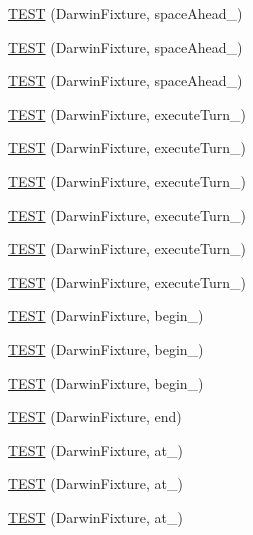 \begin{DoxyCompactItemize}
\hyperlink{TestDarwin_8c_09_09_a8eda44459d1b10b052d6e224f96d76f4}{T\-E\-S\-T} (Darwin\-Fixture, space\-Ahead\-\_)
\item 
\hyperlink{TestDarwin_8c_09_09_a5d85fe4e35632b4372030b5219815c71}{T\-E\-S\-T} (Darwin\-Fixture, space\-Ahead\-\_)
\item 
\hyperlink{TestDarwin_8c_09_09_a5425ef55ba9a7d3302777d2ee1416f3f}{T\-E\-S\-T} (Darwin\-Fixture, space\-Ahead\-\_)
\item 
\hyperlink{TestDarwin_8c_09_09_a0d2e0719c7c0bfcb95b02942c02ae39d}{T\-E\-S\-T} (Darwin\-Fixture, execute\-Turn\-\_)
\item 
\hyperlink{TestDarwin_8c_09_09_aad19062b2f5d9f6ece48370226615537}{T\-E\-S\-T} (Darwin\-Fixture, execute\-Turn\-\_)
\item 
\hyperlink{TestDarwin_8c_09_09_aec870de65cdf3fb7c80d42a12aa55fe9}{T\-E\-S\-T} (Darwin\-Fixture, execute\-Turn\-\_)
\item 
\hyperlink{TestDarwin_8c_09_09_aa91a774822d81f36945225d4fdfde383}{T\-E\-S\-T} (Darwin\-Fixture, execute\-Turn\-\_)
\item 
\hyperlink{TestDarwin_8c_09_09_a62974f5cb84f8ee398c648a38b9e75d3}{T\-E\-S\-T} (Darwin\-Fixture, execute\-Turn\-\_)
\item 
\hyperlink{TestDarwin_8c_09_09_ace108f7ddfcb903a0cb6e323e1f882a7}{T\-E\-S\-T} (Darwin\-Fixture, execute\-Turn\-\_)
\item 
\hyperlink{TestDarwin_8c_09_09_ae3c075a705b67c47ba13fdaacbf751e6}{T\-E\-S\-T} (Darwin\-Fixture, begin\-\_)
\item 
\hyperlink{TestDarwin_8c_09_09_a6e7b575f92a8dfdb75944620172971fb}{T\-E\-S\-T} (Darwin\-Fixture, begin\-\_)
\item 
\hyperlink{TestDarwin_8c_09_09_adb7ec0c6cfd77ca03c3de4c0f6a26789}{T\-E\-S\-T} (Darwin\-Fixture, begin\-\_)
\item 
\hyperlink{TestDarwin_8c_09_09_afc8eaf3f226dd3318e2e978527cba53a}{T\-E\-S\-T} (Darwin\-Fixture, end)
\item 
\hyperlink{TestDarwin_8c_09_09_adf0dd866659b69ba88b3dfc98c644072}{T\-E\-S\-T} (Darwin\-Fixture, at\-\_)
\item 
\hyperlink{TestDarwin_8c_09_09_a745c8e228d05743c6ab531fb34d3719a}{T\-E\-S\-T} (Darwin\-Fixture, at\-\_)
\item 
\hyperlink{TestDarwin_8c_09_09_acf3cfabeac514f94cc23b6e80cf50745}{T\-E\-S\-T} (Darwin\-Fixture, at\-\_)
\end{DoxyCompactItemize}



